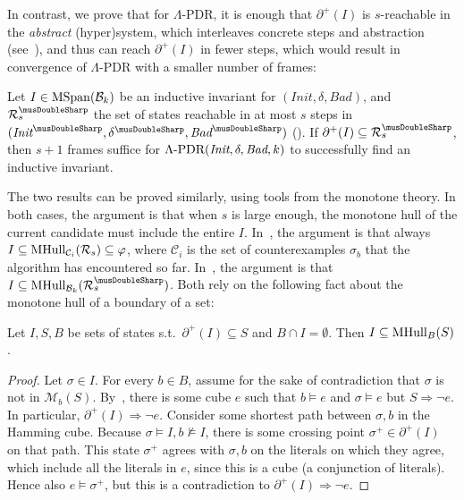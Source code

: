 \documentclass[acmsmall,screen]{acmart}
\renewcommand{\implies}{\Longrightarrow}
\newcommand{\Init}{{\textit{Init}}}
\newcommand{\Bad}{\textit{Bad}}
\newcommand{\tr}{\delta}
\newcommand{\bkwrch}[1]{\mathcal{B}_{#1}}
\newcommand{\monox}[2]{\mathcal{M}_{#2}({#1})}
\newcommand{\boundarypos}[1]{\partial^{+}({#1})}
\newcommand{\mspan}[1]{{\rm MSpan}({#1})}
\newcommand{\bkwspan}[1]{\mspan{\bkwrch{#1}}}
\newcommand{\mhull}[2]{{\rm MHull}_{#2}({#1})}
\newcommand{\absr}[1]{{#1}^{\musDoubleSharp}}
\newcommand{\eepdr}{\Lambda\mbox{\rm-PDR}}
\begin{document}
%
%
%
%
%
In contrast, we prove that for $\Lambda$-PDR, it is enough that $\boundarypos{I}$ is $s$-reachable in the \emph{abstract} (hyper)system, which interleaves concrete steps and abstraction (see~), and thus can reach $\boundarypos{I}$ in fewer steps, which would result in convergence of $\Lambda$-PDR with a smaller number of frames:
%
\begin{theorem}
\label{lem:eepdr-fence-condition}
Let $I \in \bkwspan{k}$ be an inductive invariant for $(\Init,\tr,\Bad)$,
and $\absr{\mathcal{R}}_s$ the set of states reachable in at most $s$ steps in $(\absr{\Init},\absr{\tr},\absr{\Bad})$ ().
%
%
%
If $\boundarypos{I} \subseteq \absr{\mathcal{R}}_s$,
%
then $s+1$ frames suffice for $\eepdr(\Init,\tr,\Bad,k)$ to successfully find an inductive invariant.
\end{theorem}
The two results can be proved similarly, using tools from the monotone theory. In both cases, the argument is that when $s$ is large enough, the monotone hull of the current candidate must include the entire $I$.
In~, the argument is that always $I \subseteq \mhull{\mathcal{R}_s}{\mathcal{C}_i} \subseteq \varphi$, where $\mathcal{C}_i$ is the set of counterexamples $\sigma_b$ that the algorithm has encountered so far.
In~, the argument is that $I \subseteq \mhull{\absr{\mathcal{R}}_s}{\bkwrch{k}}$.
Both rely on the following fact about the monotone hull of a boundary of a set:
\begin{lemma}
\label{lem:mhull-boundary}
Let $I,S,B$ be sets of states s.t.\ $\boundarypos{I} \subseteq S$ and $B \cap I = \emptyset$.
Then $I \subseteq \mhull{S}{B}$.
\end{lemma}
%
\begin{proof}
Let $\sigma \in I$. For every $b \in B$, assume for the sake of contradiction that $\sigma$ is not in $\monox{S}{b}$. By~, there is some cube $e$ such that $b \models e$ and $\sigma \models e$ but $S \implies \neg e$. In particular, $\boundarypos{I} \implies \neg e$. Consider some shortest path between $\sigma,b$ in the Hamming cube. Because $\sigma \models I, b \not\models I$, there is some crossing point $\sigma^{+} \in \boundarypos{I}$ on that path. This state $\sigma^{+}$ agrees with $\sigma,b$ on the literals on which they agree, which include all the literals in $e$, since this is a cube (a conjunction of literals). Hence also $e \models \sigma^{+}$, but this is a contradiction to $\boundarypos{I} \implies \neg e$.
\end{proof}
\end{document}
